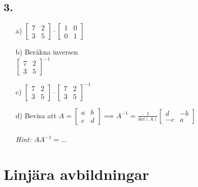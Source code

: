 \documentclass{article}
\begin{document}
\subsection*{3.}
\begin{itemize}
    \item[a) ]	
				$ 
    			\begin{bmatrix}
    			7  & 2 \\
    			3  & 5
    			\end{bmatrix}
    			\cdot
    			\begin{bmatrix}
    			1 & 0  \\
    			0 & 1
    			\end{bmatrix}
    			$
    			
    \item[b) ]	Beräkna inversen 
    			\newline
    			\\
    			$ 
    			\begin{bmatrix}
    			7  & 2 \\
    			3  & 5
    			\end{bmatrix}
				^{-1}
    			$
    			
    \item[c) ]	
    			$ 
    			\begin{bmatrix}
    			7  & 2 \\
    			3  & 5
    			\end{bmatrix}
    			\cdot
    			\begin{bmatrix}
    			7  & 2 \\
    			3  & 5
    			\end{bmatrix}
				^{-1}
    			$
    			
    \item[d) ]	Bevisa att
    			$ 
    			A = 
    			\begin{bmatrix}
    			a  & b \\
    			c  & d
    			\end{bmatrix}  
    			\implies
    			A^{-1} = 
    			\frac{1}{det(A)}
    			\begin{bmatrix}
    			d  & -b \\
    			-c & a
    			\end{bmatrix}		
    			$
    			\\
    			\\
    			\it{Hint: $A A^{-1} = ... $}
\end{itemize}

\section*{Linjära avbildningar}
\end{document}
